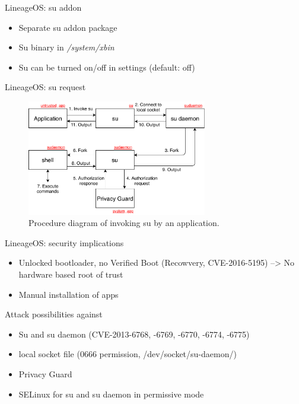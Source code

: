 \documentclass[
    11pt,%
    aspectratio=169,%
]{beamer}
\begin{document}
\begin{frame}{LineageOS: su addon}
\begin{itemize}
  \item Separate su addon package\newline
  \item Su binary in \emph{/system/xbin}\newline
  \item Su can be turned on/off in settings (default: off)\newline
\end{itemize}
\end{frame}


\begin{frame}{LineageOS: su request}
\begin{figure}
  \centering
  \includegraphics[width=0.7\textwidth]{img/lineage_su}
  \caption{Procedure diagram of invoking su by an application.}
  \label{fig:lineage_procedure_su_call}
\end{figure}
\end{frame}



\begin{frame}{LineageOS: security implications}
\begin{itemize}
  \item Unlocked bootloader, no Verified Boot (Recowvery, CVE-2016-5195)\newline
  --> No hardware based root of trust
  \item Manual installation of apps
\end{itemize}
\begin{exampleblock}{Attack possibilities against}
\begin{itemize}
  \item Su and su daemon (CVE-2013-6768, -6769, -6770, -6774, -6775)
  \item local socket file (0666 permission, /dev/socket/su-daemon/)
  \item Privacy Guard
\end{itemize}
\end{exampleblock}
\begin{itemize}
  \item SELinux for su and su daemon in permissive mode
\end{itemize}
\end{frame}
\end{document}
